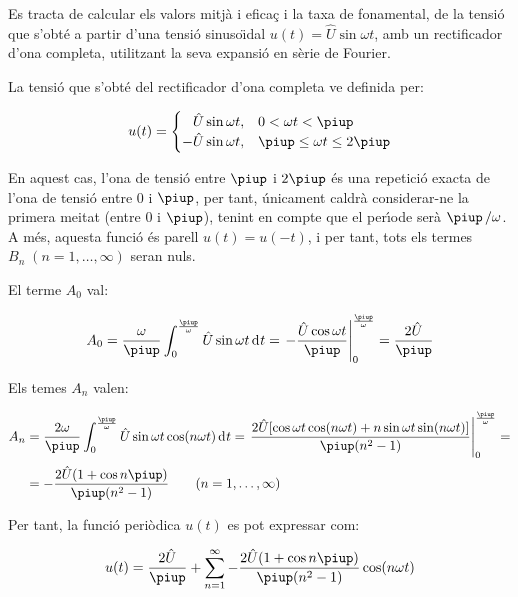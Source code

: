 \begin{exemple}
    Es tracta de calcular els valors mitj\`{a} i efica\c{c} i la taxa de
    fonamental, de la tensi\'{o} que s'obt\'{e} a partir d'una tensi\'{o}
    sinuso\"{\i}dal $u(t) = \hat{U} \sin\omega t$, amb un rectificador d'ona
    completa, utilitzant la seva expansi\'{o} en s\`{e}rie de Fourier.

    La tensi\'{o} que s'obt\'{e} del rectificador d'ona completa ve definida
    per:

    \[
    u(t) = \begin{cases} \phantom{-}\hat{U} \sin\omega t, & 0 < \omega t < \piup\\
           -\hat{U} \sin\omega t, & \piup \leq \omega t \leq 2\piup \end{cases}
    \]

    En aquest cas, l'ona de tensi\'{o} entre $\piup$ i $2\piup$ \'{e}s una repetici\'{o}
    exacta de l'ona de tensi\'{o} entre 0 i $\piup$, per tant, \'{u}nicament
    caldr\`{a} considerar-ne la primera meitat (entre 0 i $\piup$), tenint en
    compte que el per\'{\i}ode ser\`{a} $\piup\,/\omega$. A m\'{e}s, aquesta funci\'{o} \'{e}s
    parell $u(t) = u(-t)$, i per tant, tots els termes
    $B_n\;(n=1,\ldots,\infty)$ seran nuls.

    El terme $A_0$ val:

    \[
    A_0 = \frac{\omega}{\piup} \int_0^{\frac{\piup}{\omega}} \hat{U} \sin
    \omega t \diff t = \left. -\frac{\hat{U} \cos \omega t}{\piup}
    \right|_0^{\frac{\piup}{\omega}} = \frac{2\hat{U}}{\piup}
    \]

    Els temes $A_n$ valen:

    \[
    \begin{split}
    A_n &= \frac{2 \omega}{\piup} \int_0^{\frac{\piup}{\omega}} \hat{U} \sin
    \omega t \cos(n \omega t)\diff t = \left. \frac{2 \hat{U}[ \cos
    \omega t \cos (n \omega t) + n \sin \omega t \sin(n \omega
    t)]}{\piup(n^2-1)} \right|_0^{\frac{\piup}{\omega}}=\\[0.5ex]
    &= -\frac{2\hat{U}(1+\cos n \piup)}{\piup(n^2-1)}
    \qquad(n=1,\ldots,\infty)
    \end{split}
    \]

    Per tant, la funci\'{o} peri\`{o}dica $u(t)$ es pot expressar com:

    \[
        u(t) = \frac{2\hat{U}}{\piup} + \sum_{n=1}^\infty
         -\frac{2\hat{U}(1+\cos n \piup)}{\piup(n^2-1)} \cos(n \omega t)
    \]


\end{exemple}
